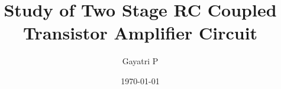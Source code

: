 \documentclass[reprint,amsmath,amssymb,aps]{revtex4-2}
\begin{document}
    \title{Study of Two Stage RC Coupled Transistor Amplifier Circuit}

    \author{Gayatri P}
    \date{\today}

    
    \maketitle

    
    
    
    

    
    
    \nocite{*}
\end{document}
